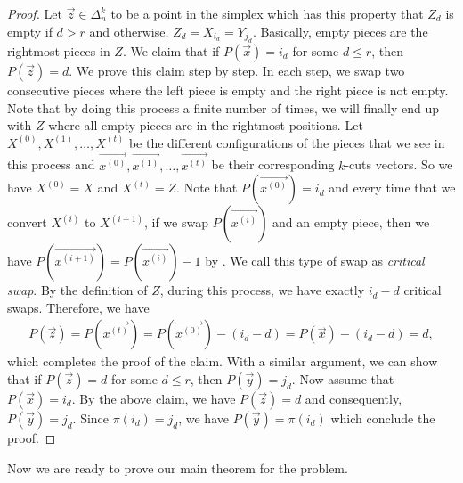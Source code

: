 \begin{proof}
Let $\vec{z} \in \Delta^k_n$ to be a point in the simplex which has this property that $Z_{d}$ is empty if $d > r$ and otherwise, $Z_d = X_{i_d} = Y_{j_d}$. Basically, empty pieces are the rightmost pieces in $Z$. We claim that if $P(\vec{x}) = i_{d}$ for some $d \leq r$, then $P(\vec{z}) = d$. We prove this claim step by step. In each step, we swap two consecutive pieces where the left piece is empty and the right piece is not empty. Note that by doing this process a finite number of times, we will finally end up with $Z$ where all empty pieces are in the rightmost positions. Let $X^{(0)}, X^{(1)}, \ldots ,X^{(t)}$ be the different configurations of the pieces that we see in this process and $\vec{x^{(0)}}, \vec{x^{(1)}},\ldots, \vec{x^{(t)}}$ be their corresponding $k$-cuts vectors. So we have $X^{(0)} = X$ and $X^{(t)} = Z$. Note that $P(\vec{x^{(0)}}) = i_d$ and every time that we convert $X^{(i)}$ to $X^{{(i+1)}}$, if we swap $P(\vec{x^{(i)}})$ and an empty piece, then we have $P(\vec{x^{{(i+1)}}}) = P(\vec{x^{(i)}}) - 1$ by . We call this type of swap as {\em critical swap}. By the definition of $Z$, during this process, we have exactly $i_d - d$ critical swaps. Therefore, we have
\begin{align*}
    P(\vec{z}) = P(\vec{x^{(t)}}) = P(\vec{x^{(0)}}) - (i_d - d) = P(\vec{x}) - (i_d - d) = d,
\end{align*}
which completes the proof of the claim. With a similar argument, we can show that if $P(\vec{z}) = d$ for some $d \leq r$, then $P(\vec{y}) = j_d$. Now assume that $P(\vec{x}) = i_d$. By the above claim, we have $P(\vec{z}) = d$ and consequently, $P(\vec{y}) = j_d$. Since $\pi(i_d) = j_d$, we have $P(\vec{y}) = \pi(i_d)$ which conclude the proof.
\end{proof}


Now we are ready to prove our main theorem for the \mccs{} problem.



